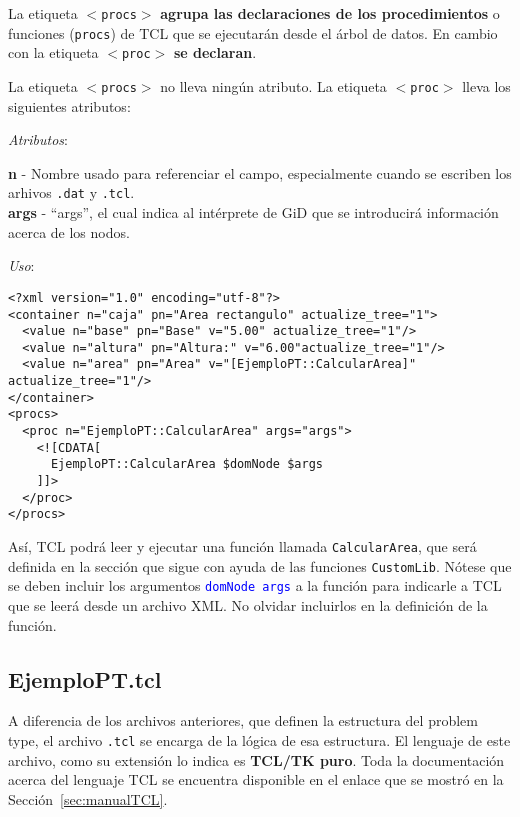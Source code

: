 \documentclass[10pt, a4paper, twocolumn]{article}
\begin{document}
La etiqueta \texttt{$<$procs$>$} \textbf{agrupa las declaraciones de los procedimientos} o funciones (\texttt{procs}) de TCL que se ejecutarán desde el árbol de datos. En cambio con la etiqueta \texttt{$<$proc$>$} \textbf{se declaran}.

La etiqueta \texttt{$<$procs$>$} no lleva ningún atributo. La etiqueta \texttt{$<$proc$>$} lleva los siguientes atributos:

\vspace{0.15cm}
\textit{Atributos}:

\vspace{0.15cm}
	\textbf{n} - Nombre usado para referenciar el campo, especialmente cuando se escriben los arhivos \texttt{.dat} y \texttt{.tcl}.\\
	\textbf{args} - ``args'', el cual indica al intérprete de GiD que se introducirá información acerca de los nodos.\\
\vspace{0.15cm}

\textit{Uso}:
\vspace{0.15cm}

\lstset{language=XML} 
\begin{lstlisting}[caption={Uso de <procs> y <proc> para invocar rutinas de TCL en XML. Nótese el uso de la función del namespace EjemploPT}]
<?xml version="1.0" encoding="utf-8"?>
<container n="caja" pn="Area rectangulo" actualize_tree="1">
  <value n="base" pn="Base" v="5.00" actualize_tree="1"/>
  <value n="altura" pn="Altura:" v="6.00"actualize_tree="1"/>
  <value n="area" pn="Area" v="[EjemploPT::CalcularArea]" actualize_tree="1"/>
</container>
<procs>
  <proc n="EjemploPT::CalcularArea" args="args">
    <![CDATA[
      EjemploPT::CalcularArea $domNode $args
    ]]>
  </proc>
</procs>
\end{lstlisting}

Así, TCL podrá leer y ejecutar una función llamada \texttt{CalcularArea}, que será definida en la sección que sigue con ayuda de las funciones \texttt{CustomLib}. Nótese que se deben incluir los argumentos \textcolor{blue}{\texttt{domNode args}} a la función para indicarle a TCL que se leerá desde un archivo XML. No olvidar incluirlos en la definición de la función. 


\subsection{EjemploPT.tcl}

A diferencia de los archivos anteriores, que definen la estructura del problem type, el archivo \texttt{.tcl} se encarga de la lógica de esa estructura. El lenguaje de este archivo, como su extensión lo indica es \textbf{TCL/TK puro}. Toda la documentación acerca del lenguaje TCL se encuentra disponible en el enlace que se mostró en la Sección~\ref{sec:manualTCL}.
\end{document}
